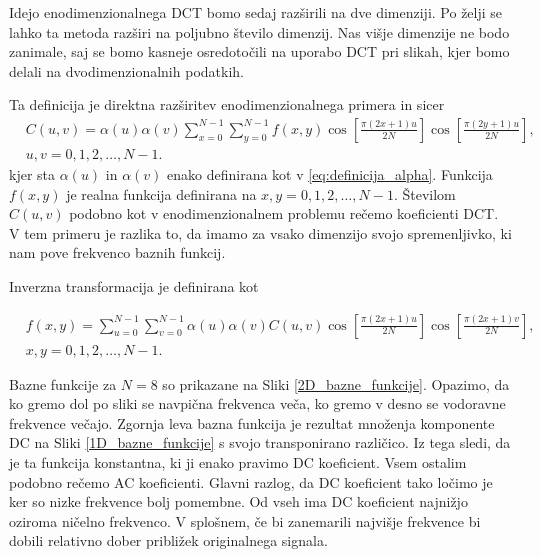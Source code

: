 \documentclass[a4paper,12pt,openright]{book}
\begin{document}
Idejo enodimenzionalnega DCT bomo sedaj razširili na dve dimenziji. Po želji se lahko ta metoda razširi na poljubno število dimenzij. Nas višje dimenzije ne bodo zanimale, saj se bomo kasneje osredotočili na uporabo DCT pri slikah, kjer bomo delali na dvodimenzionalnih podatkih. \par
Ta definicija je direktna razširitev enodimenzionalnega primera in sicer
\begin{equation}
    \begin{aligned}
    &C(u,v) = \alpha(u) \alpha(v) \sum_{x=0}^{N-1}\sum_{y=0}^{N-1} f(x,y)
    \cos\left[\frac{\pi(2x+1)u}{2N}\right]
    \cos\left[\frac{\pi(2y+1)u}{2N}\right], \\
    &u,v = 0,1,2,\ldots,N-1.
    \end{aligned}
\label{eq:2D-DCT}
\end{equation}
kjer sta $\alpha(u)$ in $\alpha(v)$ enako definirana kot v \eqref{eq:definicija_alpha}. Funkcija $f(x,y)$ je realna funkcija definirana na $x,y = 0,1,2,\ldots,N-1$. Številom $C(u,v)$ podobno kot v enodimenzionalnem problemu rečemo koeficienti DCT. V tem primeru je razlika to, da imamo za vsako dimenzijo svojo spremenljivko, ki nam pove frekvenco baznih funkcij.\par
Inverzna transformacija je definirana kot

\begin{equation}
    \begin{aligned}
    &f(x,y) = \sum_{u=0}^{N-1}\sum_{v=0}^{N-1} \alpha(u) \alpha(v) C(u,v)
    \cos\left[\frac{\pi(2x+1)u}{2N}\right]
    \cos\left[\frac{\pi(2x+1)v}{2N}\right],  \\
    &x,y = 0,1,2,\ldots,N-1.
    \end{aligned}
\label{eq:2D-DCT-inverse}
\end{equation}

Bazne funkcije za $N=8$ so prikazane na Sliki \ref{2D_bazne_funkcije}. Opazimo, da ko gremo dol po sliki se navpična frekvenca veča, ko gremo v desno se vodoravne frekvence večajo. Zgornja leva bazna funkcija je rezultat množenja komponente DC na Sliki \ref{1D_bazne_funkcije} s svojo transponirano različico. Iz tega sledi, da je ta funkcija konstantna, ki ji enako pravimo DC koeficient. Vsem ostalim podobno rečemo AC koeficienti. Glavni razlog, da DC koeficient tako ločimo je ker so nizke frekvence bolj pomembne. Od vseh ima DC koeficient najnižjo oziroma ničelno frekvenco. V splošnem, če bi zanemarili najvišje frekvence bi dobili relativno dober približek originalnega signala.\par
\end{document}
